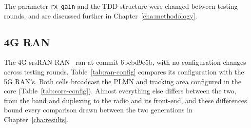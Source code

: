 The parameter \texttt{rx\_gain} and the \gls{TDD} structure were changed between testing rounds, and are discussed further in Chapter~\ref{cha:methodology}.

\subsection{4G RAN}
\label{sec:ran-4g}

The 4G srsRAN \gls{RAN}~\cite{srsran_4g_repo} ran at commit 6bcbd9e5b, with no configuration changes across testing rounds. Table~\ref{tab:ran-config} compares its configuration with the 5G \gls{RAN}'s. Both cells broadcast the \gls{PLMN} and tracking area configured in the core (Table~\ref{tab:core-config}). Almost everything else differs between the two, from the band and duplexing to the radio and its front-end, and these differences bound every comparison drawn between the two generations in Chapter~\ref{cha:results}.

